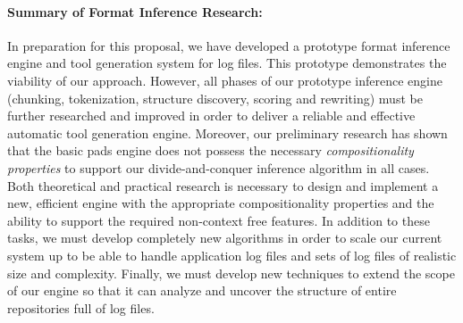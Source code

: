 \paragraph*{Summary of Format Inference Research:}  
In preparation for this proposal, we have developed a prototype
format inference engine and tool generation system for log files.  
This prototype demonstrates
the viability of our approach.  However, all phases of
our prototype inference engine (chunking, tokenization, structure discovery,
scoring and rewriting) must be further researched and 
improved in order to deliver a reliable and
effective automatic tool generation engine.  Moreover, our preliminary
research has shown that
the basic pads engine does not possess the necessary {\em compositionality
properties} to support our divide-and-conquer inference algorithm in all cases.
Both theoretical and practical research is necessary to design and
implement a new, efficient engine with the appropriate compositionality
properties and the ability to support the required non-context free features.
In addition to these tasks, we must develop
completely new algorithms in order to scale our current system up to 
be able to handle application log files and sets of log files
of realistic size and complexity.
Finally, we must develop new techniques to extend the scope of our engine
so that it can analyze and uncover the structure
of entire repositories full of log files.
